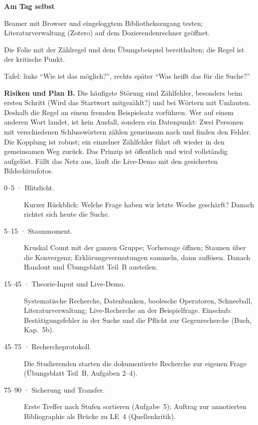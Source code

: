 \begin{vorbereitung}
\textbf{Am Tag selbst}
\begin{checkliste}
  \item Beamer mit Browser und eingeloggtem Bibliothekszugang testen;
    Literaturverwaltung (Zotero) auf dem Dozierendenrechner geöffnet.
  \item Die Folie mit der Zählregel und dem Übungsbeispiel bereithalten;
    die Regel ist der kritische Punkt.
  \item Tafel: links \enquote{Wie ist das möglich?}, rechts später
    \enquote{Was heißt das für die Suche?}
\end{checkliste}

\textbf{Risiken und Plan B.} Die häufigste Störung sind Zählfehler,
besonders beim ersten Schritt (Wird das Startwort mitgezählt?) und bei
Wörtern mit Umlauten. Deshalb die Regel an einem fremden Beispielsatz
vorführen. Wer auf einem anderen Wort landet, ist kein Ausfall, sondern ein
Datenpunkt: Zwei Personen mit verschiedenen Schlusswörtern zählen
gemeinsam nach und finden den Fehler. Die Kopplung ist robust; ein
einzelner Zählfehler führt oft wieder in den gemeinsamen Weg zurück. Das
Prinzip ist öffentlich und wird vollständig aufgelöst. Fällt das Netz aus,
läuft die Live-Demo mit den gesicherten Bildschirmfotos.
\end{vorbereitung}

\begin{ablauf}
\begin{description}
\item[0--5 · Blitzlicht.] Kurzer Rückblick: Welche Frage haben wir letzte
  Woche geschärft? Danach richtet sich heute die Suche.
\item[5--15 · Staunmoment.] Kruskal Count mit der ganzen Gruppe;
  Vorhersage öffnen; Staunen über die Konvergenz; Erklärungsvermutungen
  sammeln, dann auflösen. Danach Handout und Übungsblatt Teil~B austeilen.
\item[15--45 · Theorie-Input und Live-Demo.] Systematische Recherche,
  Datenbanken, boolesche Operatoren, Schneeball, Literaturverwaltung;
  Live-Recherche an der Beispielfrage. Einschub: Bestätigungsfehler in der
  Suche und die Pflicht zur Gegenrecherche (Buch, Kap.~5b).
\item[45--75 · Rechercheprotokoll.] Die Studierenden starten die
  dokumentierte Recherche zur eigenen Frage (Übungsblatt Teil~B,
  Aufgaben 2--4).
\item[75--90 · Sicherung und Transfer.] Erste Treffer nach Stufen sortieren
  (Aufgabe~5); Auftrag zur annotierten Bibliographie als Brücke zu LE~4
  (Quellenkritik).
\end{description}
\end{ablauf}

